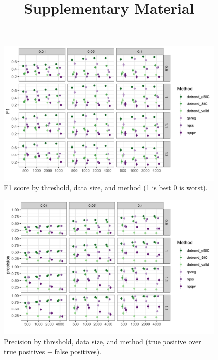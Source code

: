 \documentclass[12pt]{article}
\begin{document}
	\title{Supplementary Material}	 
	\begin{figure}[h!]
		\caption{F1 score by threshold, data size, and method (1 is best 0 is worst).}
		\includegraphics[width = \linewidth]{Figures/peaks_F1.png}
	\end{figure}
	
	\begin{figure}[h!]
		\caption{Precision by threshold, data size, and method (true positive over true positives + false positives).}
		\includegraphics[width = \linewidth]{Figures/peaks_precision.png}
	\end{figure}
	
\end{document}
